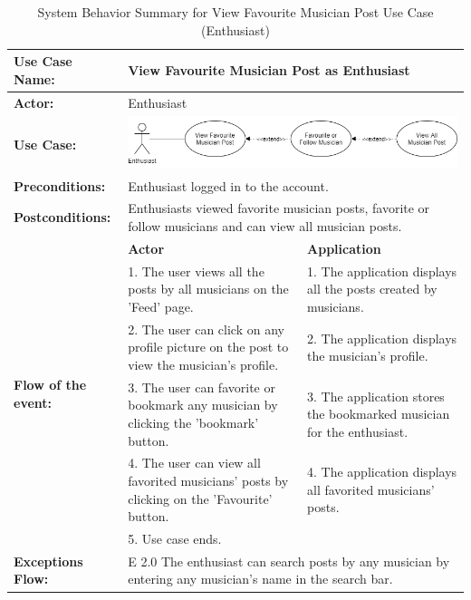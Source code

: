 \begin{longtable}{|p{3cm}|p{5cm}|p{5cm}|}
    \caption{System Behavior Summary for View Favourite Musician Post Use Case (Enthusiast)} \\
    \hline
    \textbf{Use Case Name:} & \multicolumn{2}{l|}{View Favourite Musician Post as Enthusiast} \\ \hline
    \textbf{Actor:} & \multicolumn{2}{l|}{Enthusiast} \\ \hline
    \textbf{Use Case:} & \multicolumn{2}{l|}{\includegraphics[width=0.5\linewidth]{mainmatter/images/sucd11.png}} \\ \hline
    \textbf{Preconditions:} & \multicolumn{2}{p{10cm}|}{Enthusiast logged in to the account.} \\ \hline
    \textbf{Postconditions:} & \multicolumn{2}{p{10cm}|}{Enthusiasts viewed favorite musician posts, favorite or follow musicians and can view all musician posts.} \\ \hline
    \multirow{6}{3cm}{\raggedright \textbf{Flow of the event:}} & \textbf{Actor} & \textbf{Application} \\ \cline{2-3}
    & 1. The user views all the posts by all musicians on the 'Feed' page. & 1. The application displays all the posts created by musicians. \\ \cline{2-3}
    & 2. The user can click on any profile picture on the post to view the musician's profile. & 2. The application displays the musician's profile.  \\ \cline{2-3}
    & 3. The user can favorite or bookmark any musician by clicking the 'bookmark' button. & 3. The application stores the bookmarked musician for the enthusiast. \\ \cline{2-3}
    & 4. The user can view all favorited musicians’ posts by clicking on the 'Favourite' button. & 4. The application displays all favorited musicians’ posts. \\ \cline{2-3}
    & 5. Use case ends. & \\ \hline
    \multirow{1}{3cm}{\raggedright \textbf{Exceptions Flow:}} & \multicolumn{2}{p{10cm}|}{\raggedright E 2.0 The enthusiast can search posts by any musician by entering any musician's name in the search bar.} \\ \hline
\end{longtable}
\pagebreak

